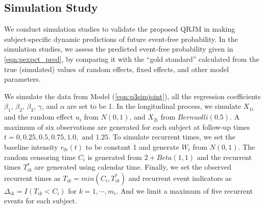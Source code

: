 







% 

\subsection{Simulation Study} \label{sec:p3simulation}
We conduct simulation studies to validate the proposed QRJM in making subject-specific dynamic predictions of future event-free probability. In the simulation studies, we assess the predicted event-free probability given in \eqref{eqn:pexpct_pred}, by comparing it with the ``gold standard'' calculated from the true (simulated) values of random effects, fixed effects, and other model parameters.

We simulate the data from Model (\ref{eqn:p3simjoint}), all the regression coefficients $\beta_1$, $\beta_2$, $\beta_3$, $\gamma$, and $\alpha$ are set to be 1. In the longitudinal process, we simulate $X_{1i}$ and the random effect $u_i$ from $N(0, 1)$, and $X_{2i}$ from $Bernuolli(0.5)$. A maximum of six observations are generated for each subject at follow-up times $t=0, 0.25, 0.5, 0.75, 1.0, \mbox{ and }1.25$. To simulate recurrent times, we set the baseline intensity $r_{0i}(t)$ to be constant 1 and generate $W_i$ from $N(0, 1)$. The random censoring time $C_i$ is generated from $2+Beta(1,1)$ and the recurrent times $T_{ik}^*$ are generated using calendar time. Finally, we set the observed recurrent times as $T_{ik} = min(C_i, T_{ik}^*)$ and recurrent event indicators as $\Delta_{ik} = I(T_{ik} < C_i)$ for $k=1, \cdots, m_i$. And we limit a maximum of five recurrent events for each subject.

